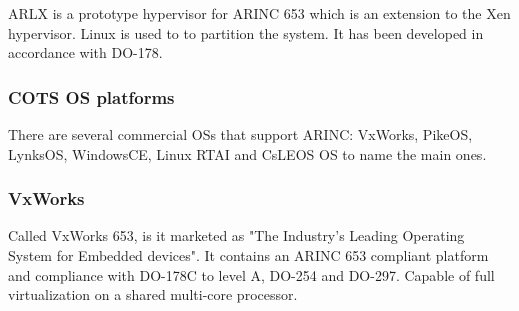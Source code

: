 ARLX is a prototype hypervisor for ARINC 653 which is an extension to the Xen hypervisor. Linux is used to to partition the system. It has been developed in accordance with DO-178.


\subsubsection{COTS OS platforms}

There are several commercial OSs that support ARINC: VxWorks, PikeOS, LynksOS, WindowsCE, Linux RTAI and CsLEOS OS to name the main ones.

\subsubsection{VxWorks}
Called VxWorks 653, is it marketed as "The Industry's Leading Operating System for Embedded devices". It contains an ARINC 653 compliant platform and compliance with DO-178C to level A, DO-254 and DO-297. Capable of full virtualization on a shared multi-core processor.



\section{}
